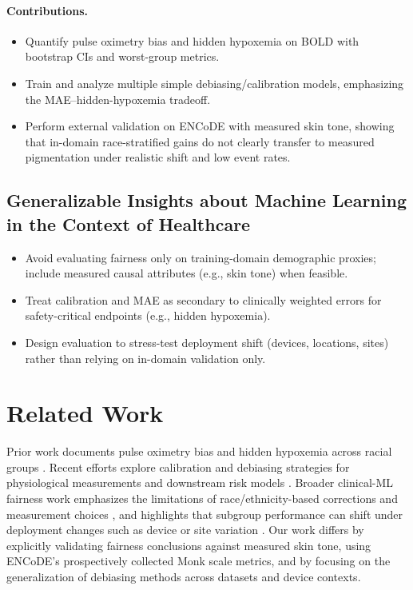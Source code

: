 \documentclass[pmlr]{jmlr}%
\begin{document}
\paragraph{Contributions.}
\begin{itemize}
\item Quantify pulse oximetry bias and hidden hypoxemia on BOLD with bootstrap CIs and worst-group metrics.
\item Train and analyze multiple simple debiasing/calibration models, emphasizing the MAE--hidden-hypoxemia tradeoff.
\item Perform external validation on ENCoDE with measured skin tone, showing that in-domain race-stratified gains do not clearly transfer to measured pigmentation under realistic shift and low event rates.
\end{itemize}

\subsection*{Generalizable Insights about Machine Learning in the Context of Healthcare}
\begin{itemize}
\item Avoid evaluating fairness only on training-domain demographic proxies; include measured causal attributes (e.g., skin tone) when feasible.
\item Treat calibration and MAE as secondary to clinically weighted errors for safety-critical endpoints (e.g., hidden hypoxemia).
\item Design evaluation to stress-test deployment shift (devices, locations, sites) rather than relying on in-domain validation only.
\end{itemize}

\section{Related Work}

Prior work documents pulse oximetry bias and hidden hypoxemia across racial groups \cite{sjoding2020racial,wong2021discrepancies}. Recent efforts explore calibration and debiasing strategies for physiological measurements and downstream risk models \cite{zadrozny2002,obermeyer2019}. Broader clinical-ML fairness work emphasizes the limitations of race/ethnicity-based corrections and measurement choices \cite{vyas2020hidden,suresh2021framework}, and highlights that subgroup performance can shift under deployment changes such as device or site variation \cite{suresh2021framework}. Our work differs by explicitly validating fairness conclusions against measured skin tone, using ENCoDE's prospectively collected Monk scale metrics, and by focusing on the generalization of debiasing methods across datasets and device contexts.
\end{document}
